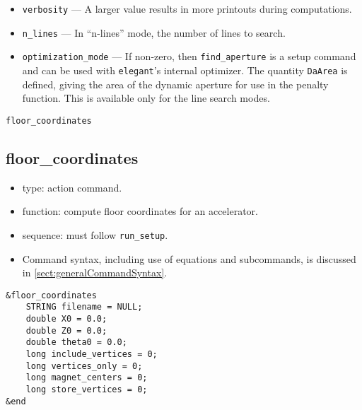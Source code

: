\documentclass[11pt]{article}
\begin{document}
\begin{itemize}
\item \verb|verbosity| --- A larger value results in more printouts during computations.

\item \verb|n_lines| --- In ``n-lines'' mode, the number of lines to search.

\item \verb|optimization_mode| --- If non-zero, then \verb|find_aperture| is a setup command and can be used
with {\tt elegant}'s internal optimizer.  The quantity \verb|DaArea| is defined, giving the area of the dynamic
aperture for use in the penalty function.  This is available only for the line search modes.

\end{itemize}

\newpage
\begin{center}{\Large\verb|floor_coordinates|}\end{center}
\subsection{floor\_coordinates \label{subsec:floorcoordinates}}

\begin{itemize}
\item type: action command.
\item function: compute floor coordinates for an accelerator.
\item sequence: must follow \verb|run_setup|.
\item Command syntax, including use of equations and subcommands, is discussed in \ref{sect:generalCommandSyntax}.
\end{itemize}

\begin{verbatim}
&floor_coordinates
    STRING filename = NULL;
    double X0 = 0.0;
    double Z0 = 0.0;
    double theta0 = 0.0;
    long include_vertices = 0;
    long vertices_only = 0;
    long magnet_centers = 0;
    long store_vertices = 0;
&end
\end{verbatim}
\end{document}

